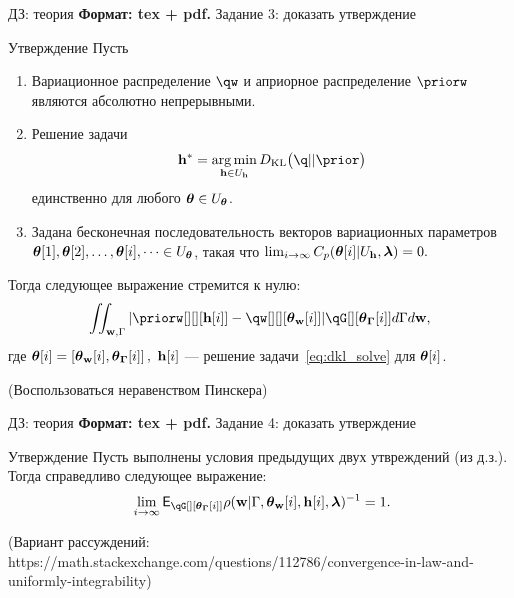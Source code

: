 \documentclass[10pt,pdf,utf8,russian,aspectratio=169]{beamer}
\DeclareMathOperator*{\argmin}{arg\,min}
\begin{document}
\begin{frame}{ДЗ: теория}
\footnotesize
\textbf{Формат: tex + pdf.}
Задание 3: доказать утверждение
\begin{block}{Утверждение}
Пусть
\begin{enumerate}
\item Вариационное распределение $\qw$ и априорное распределение $\priorw$  являются абсолютно непрерывными.

\item Решение задачи 
\begin{equation}
\label{eq:dkl_solve}
\h^{*} = \argmin_{\h \in \Uh} \KL{\q}{\prior}
\end{equation} единственно для любого $\boldsymbol{\theta} \in U_{\boldsymbol{\theta}}$.



\item Задана  бесконечная последовательность векторов вариационных параметров $\boldsymbol{\theta}[1],\boldsymbol{\theta}[2],\dots,\boldsymbol{\theta}[i],\dots \in U_{\boldsymbol{\theta}}$, такая что $\lim_{i \to \infty}C_p(\boldsymbol{\theta}[i]|U_{\mathbf{h}},\boldsymbol{\lambda}) = 0.$
\end{enumerate}

Тогда следующее выражение стремится к нулю:
\[
 \iint_{\w,\Gamma} |\priorw[][][{\h[i]}] - \qw[][][{\tetaw[i]}]| \qG[][{\tetaG[i]}] d\Gamma d\w,
\]
где $\boldsymbol{\theta}[i] = \left[\boldsymbol{\theta}_\mathbf{w}[i], \boldsymbol{\theta}_{\boldsymbol{\Gamma}}[i]\right],$ $\mathbf{h}[i]$ --- решение задачи~\eqref{eq:dkl_solve} для $\boldsymbol{\theta}[i]$.


\end{block}
(Воспользоваться неравенством Пинскера)
\end{frame}


\begin{frame}{ДЗ: теория}
\small
\textbf{Формат: tex + pdf.}
Задание 4: доказать утверждение
\begin{block}{Утверждение}
Пусть выполнены условия предыдущих двух утвреждений (из д.з.).
Тогда справедливо следующее выражение:
\[
   \lim_{i \to \infty} \E_{\qG[][{\tetaG[i]}]} {\rho}(\w|\Gamma, {\tetaw[i]}, {\h[i]}, \lam)^{-1} = 1.
\]
\end{block}
(Вариант рассуждений: https://math.stackexchange.com/questions/112786/convergence-in-law-and-uniformly-integrability)
\end{frame}
\end{document}
